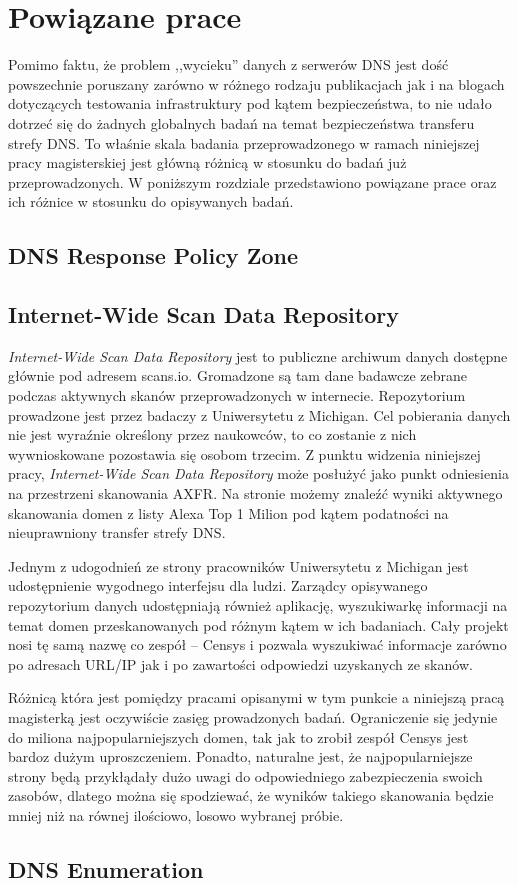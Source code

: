 \chapter{Powiązane prace}
Pomimo faktu, że problem ,,wycieku'' danych z serwerów DNS jest dość powszechnie poruszany zarówno w różnego rodzaju publikacjach\cite{} jak i na blogach dotyczących testowania infrastruktury pod kątem bezpieczeństwa\cite{}, to nie udało dotrzeć się do żadnych globalnych badań na temat bezpieczeństwa transferu strefy DNS. To właśnie skala badania przeprowadzonego w ramach niniejszej pracy magisterskiej jest główną różnicą w stosunku do badań już przeprowadzonych. W poniższym rozdziale przedstawiono powiązane prace oraz ich różnice w stosunku do opisywanych badań.

\section{DNS Response Policy Zone}


\section{Internet-Wide Scan Data Repository}
\textit{Internet-Wide Scan Data Repository} jest to publiczne archiwum danych dostępne głównie pod adresem scans.io\cite{scansio}. Gromadzone są tam dane badawcze zebrane podczas aktywnych skanów przeprowadzonych w internecie. Repozytorium prowadzone jest przez badaczy z Uniwersytetu z Michigan\cite{teamcensys}. Cel pobierania danych nie jest wyraźnie określony przez naukowców, to co zostanie z nich wywnioskowane pozostawia się osobom trzecim. Z punktu widzenia niniejszej pracy, \textit{Internet-Wide Scan Data Repository} może posłużyć jako punkt odniesienia na przestrzeni skanowania AXFR. Na stronie możemy znaleźć wyniki aktywnego skanowania domen z listy Alexa Top 1 Milion\cite{alexa} pod kątem podatności na nieuprawniony transfer strefy DNS.

Jednym z udogodnień ze strony pracowników Uniwersytetu z Michigan jest udostępnienie wygodnego interfejsu dla ludzi. Zarządcy opisywanego repozytorium danych udostępniają również aplikację, wyszukiwarkę informacji na temat domen przeskanowanych pod różnym kątem w ich badaniach. Cały projekt nosi tę samą nazwę co zespół -- Censys\cite{censys} i pozwala wyszukiwać informacje zarówno po adresach URL/IP jak i po zawartości odpowiedzi uzyskanych ze skanów.

Różnicą która jest pomiędzy pracami opisanymi w tym punkcie a niniejszą pracą magisterką jest oczywiście zasięg prowadzonych badań. Ograniczenie się jedynie do miliona najpopularniejszych domen, tak jak to zrobił zespół Censys\cite{censys} jest bardoz dużym uproszczeniem. Ponadto, naturalne jest, że najpopularniejsze strony będą przykłądały dużo uwagi do odpowiedniego zabezpieczenia swoich zasobów, dlatego można się spodziewać, że wyników takiego skanowania będzie mniej niż na równej ilościowo, losowo wybranej próbie. 

\section{DNS Enumeration}
